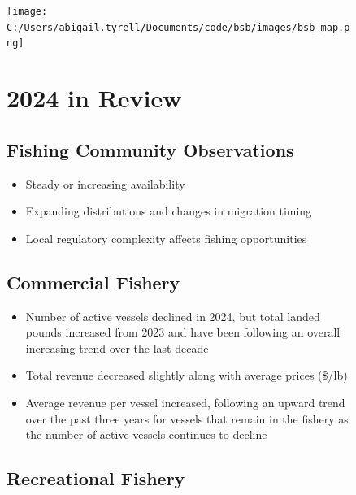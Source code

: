 \documentclass[
  10pt,
  letterpaper,
  DIV=11,
  numbers=noendperiod]{scrartcl}
\providecommand{\tightlist}{%
  \setlength{\itemsep}{0pt}\setlength{\parskip}{0pt}}\usepackage{longtable,booktabs,array}
\begin{document}
\begin{figure}

\begin{minipage}{0.40\linewidth}
\texttt{[image: C:/Users/abigail.tyrell/Documents/code/bsb/images/bsb\_map.png]}\end{minipage}%
%
\begin{minipage}{0.03\linewidth}

\hfill

\end{minipage}%
%
\begin{minipage}{0.57\linewidth}

\section{2024 in Review}

\subsection{Fishing Community Observations}

\begin{itemize}
\tightlist
\item
  Steady or increasing availability
\item
  Expanding distributions and changes in migration timing
\item
  Local regulatory complexity affects fishing opportunities
\end{itemize}

\subsection{Commercial Fishery}

\begin{itemize}
\tightlist
\item
  Number of active vessels declined in 2024, but total landed pounds
  increased from 2023 and have been following an overall increasing
  trend over the last decade
\item
  Total revenue decreased slightly along with average prices (\$/lb)
\item
  Average revenue per vessel increased, following an upward trend over
  the past three years for vessels that remain in the fishery as the
  number of active vessels continues to decline
\end{itemize}

\subsection{Recreational Fishery}


\end{minipage}
\end{figure}
\end{document}
